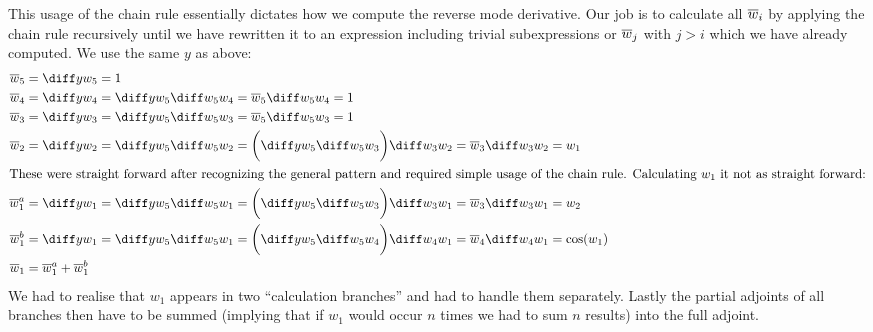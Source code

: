 This usage of the chain rule essentially dictates how we compute the reverse mode derivative. Our job is to calculate all $\overline{w}_{i}$ by applying the chain rule recursively until we have rewritten it to an expression including trivial subexpressions or $\overline{w}_{j}$ with $j > i$ which we have already computed.  We use the same $y$ as above:
\yExampleDiff
\begin{align*}
    \overw{5}   & = \diffyw{5} = 1                                                                                                           \\
    \overw{4}   & = \diffyw{4} = \diffyw{5}\diffw{5}{4} = \overw{5}\diffw{5}{4} = 1                                                          \\
    \overw{3}   & = \diffyw{3} = \diffyw{5}\diffw{5}{3} = \overw{5}\diffw{5}{3} = 1                                                          \\
    \overw{2}   & = \diffyw{2} = \diffyw{5}\diffw{5}{2} = \bigg(\diffyw{5}\diffw{5}{3}\bigg)\diffw{3}{2} = \overw{3}\diffw{3}{2} = w_1       \\
    \intertext{These were straight forward after recognizing the general pattern and required simple usage of the chain rule. Calculating $w_1$ it not as straight forward:}
    \overw{1}^a & = \diffyw{1} = \diffyw{5}\diffw{5}{1} = \bigg(\diffyw{5}\diffw{5}{3}\bigg)\diffw{3}{1} = \overw{3}\diffw{3}{1} = w_2       \\
    \overw{1}^b & = \diffyw{1} = \diffyw{5}\diffw{5}{1} = \bigg(\diffyw{5}\diffw{5}{4}\bigg)\diffw{4}{1} = \overw{4}\diffw{4}{1} = \cos(w_1) \\
    \overw{1}   & = \overw{1}^a + \overw{1}^b
\end{align*}
We had to realise that $w_1$ appears in two ``calculation branches'' and had to handle them separately. Lastly the partial adjoints of all branches then have to be summed (implying that if $w_1$ would occur $n$ times we had to sum $n$ results) into the full adjoint.

